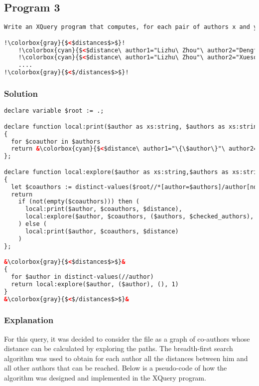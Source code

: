\documentclass{article}
\begin{document}
\subsection{Program 3}
\begin{lstlisting}[language=xml, escapechar=!]
Write an XQuery program that computes, for each pair of authors x and y !$\ne$! x the distance between x and y using the following output format.

!\colorbox{gray}{$<$distances$>$}!
    !\colorbox{cyan}{$<$distance\ author1="Lizhu\ Zhou"\ author2="Dengfeng\ Zhang"\ distance="3"/$>$}!
    !\colorbox{cyan}{$<$distance\ author1="Lizhu\ Zhou"\ author2="Xuesong\ Yan"\ distance="2"/$>$}!
    ....
!\colorbox{gray}{$<$/distances$>$}!
\end{lstlisting}

\subsubsection{Solution}
\begin{lstlisting}[language=xml, frame=none, escapechar=&]
declare variable $root := .;

declare function local:print($author as xs:string, $authors as xs:string*, $distance as xs:integer)
{
  for $coauthor in $authors
  return &\colorbox{cyan}{$<$distance\ author1="\{\$author\}"\ author2="\{\$coauthor\}"\ distance="\{\$distance\}"/$>$}&
};

declare function local:explore($author as xs:string,$authors as xs:string*, $checked_authors as xs:string*, $distance as xs:integer)
{
  let $coauthors := distinct-values($root//*[author=$authors]/author[not(.=($authors,$checked_authors))])
  return
    if (not(empty($coauthors))) then (
      local:print($author, $coauthors, $distance),
      local:explore($author, $coauthors, ($authors, $checked_authors), $distance+1)
    ) else (
      local:print($author, $coauthors, $distance)
    )
};

&\colorbox{gray}{$<$distances$>$}&
{
  for $author in distinct-values(//author)
  return local:explore($author, ($author), (), 1)
}
&\colorbox{gray}{$<$/distances$>$}&
\end{lstlisting}
\subsubsection{Explanation}

For this query, it was decided to consider the file as a graph of co-authors whose distance can be calculated by exploring the paths. The breadth-first search algorithm was used to obtain for each author all the distances between him and all other authors that can be reached. Below is a pseudo-code of how the algorithm was designed and implemented in the XQuery program.
\end{document}

